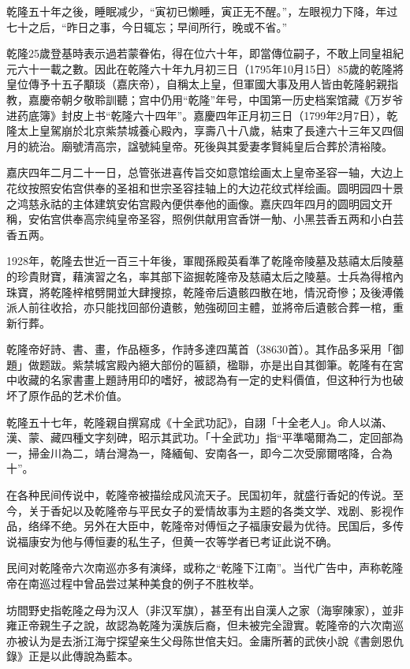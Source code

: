 乾隆五十年之後，睡眠减少，“寅初已懒睡，寅正无不醒。”，左眼视力下降，年过七十之后，“昨日之事，今日辄忘；早间所行，晚或不省。”

乾隆25歲登基時表示過若蒙眷佑，得在位六十年，即當傳位嗣子，不敢上同皇祖紀元六十一載之數。因此在乾隆六十年九月初三日（1795年10月15日）85歲的乾隆將皇位傳予十五子顒琰（嘉庆帝），自稱太上皇，但軍國大事及用人皆由乾隆躬親指教，嘉慶帝朝夕敬聆訓聽；宫中仍用“乾隆”年号，中国第一历史档案馆藏《万岁爷进药底簿》封皮上书“乾隆六十四年”。嘉慶四年正月初三日（1799年2月7日），乾隆太上皇駕崩於北京紫禁城養心殿內，享壽八十八歲，結束了長達六十三年又四個月的統治。廟號清高宗，諡號純皇帝。死後與其愛妻孝賢純皇后合葬於清裕陵。

嘉庆四年二月二十一日，总管张进喜传旨交如意馆绘画太上皇帝圣容一轴，大边上花纹按照安佑宫供奉的圣祖和世宗圣容挂轴上的大边花纹式样绘画。圆明园四十景之鸿慈永祜的主体建筑安佑宫殿內便供奉他的画像。嘉庆四年四月的圆明园文开稱，安佑宫供奉高宗纯皇帝圣容，照例供献用宫香饼一觔、小黑芸香五两和小白芸香五两。

1928年，乾隆去世近一百三十年後，軍閥孫殿英看準了乾隆帝陵墓及慈禧太后陵墓的珍貴財寶，藉演習之名，率其部下盜掘乾隆帝及慈禧太后之陵墓。士兵為得棺內珠寶，將乾隆梓棺劈開並大肆搜掠，乾隆帝后遺骸四散在地，情況奇慘；及後溥儀派人前往收拾，亦只能找回部份遺骸，勉強砌回主體，並將帝后遺骸合葬一棺，重新行葬。

乾隆帝好詩、書、畫，作品極多，作詩多達四萬首（38630首）。其作品多采用「御題」做题跋。紫禁城宮殿內絕大部份的匾額，楹聯，亦是出自其御筆。乾隆有在宮中收藏的名家書畫上題詩用印的嗜好，被認為有一定的史料價值，但这种行为也破坏了原作品的艺术价值。

乾隆五十七年，乾隆親自撰寫成《十全武功記》，自詡「十全老人」。命人以滿、漢、蒙、藏四種文字刻碑，昭示其武功。「十全武功」指“平準噶爾為二，定回部為一，掃金川為二，靖台灣為一，降緬甸、安南各一，即今二次受廓爾喀降，合為十”。

在各种民间传说中，乾隆帝被描绘成风流天子。民国初年，就盛行香妃的传说。至今，关于香妃以及乾隆帝与平民女子的爱情故事为主题的各类文学、戏剧、影视作品，络绎不绝。另外在大臣中，乾隆帝对傅恒之子福康安最为优待。民国后，多传说福康安为他与傅恒妻的私生子，但黄一农等学者已考证此说不确。

民间对乾隆帝六次南巡亦多有演绎，或称之“乾隆下江南”。当代广告中，声称乾隆帝在南巡过程中曾品尝过某种美食的例子不胜枚举。

坊間野史指乾隆之母为汉人（非汉军旗），甚至有出自漢人之家（海寧陳家），並非雍正帝親生子之說，故認為乾隆为漢族后裔，但未被完全證實。乾隆帝的六次南巡亦被认为是去浙江海宁探望亲生父母陈世倌夫妇。金庸所著的武俠小說《書劍恩仇錄》正是以此傳說為藍本。

